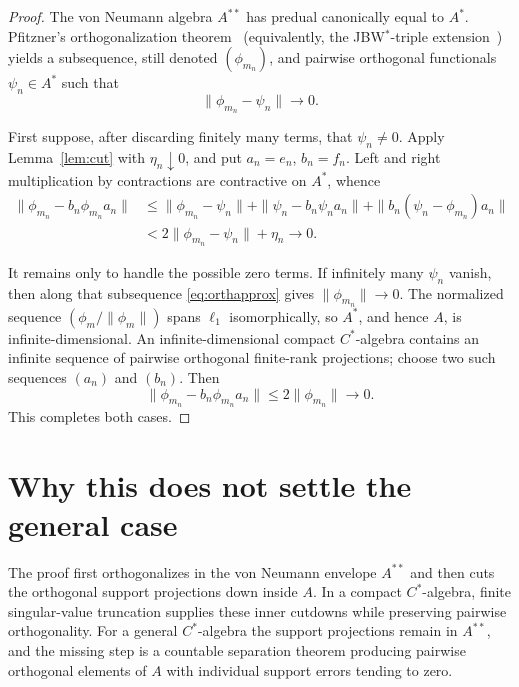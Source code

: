 \documentclass[11pt]{article}
\begin{document}
\begin{proof}
The von Neumann algebra $A^{**}$ has predual canonically equal to $A^*$.
Pfitzner's orthogonalization theorem~\cite[Theorem 1.2]{Pfi02} (equivalently,
the JBW$^*$-triple extension~\cite[Theorem 4.1]{PP16}) yields a subsequence,
still denoted $(\phi_{m_n})$, and pairwise orthogonal functionals
$\psi_n\in A^*$ such that
\begin{equation}\label{eq:orthapprox}
 \|\phi_{m_n}-\psi_n\|\longrightarrow0.
\end{equation}

First suppose, after discarding finitely many terms, that $\psi_n\ne0$.
Apply Lemma~\ref{lem:cut} with $\eta_n\downarrow0$, and put
$a_n=e_n$, $b_n=f_n$.  Left and right multiplication by contractions are
contractive on $A^*$, whence
\begin{align*}
 \|\phi_{m_n}-b_n\phi_{m_n}a_n\|
 &\le \|\phi_{m_n}-\psi_n\|
      +\|\psi_n-b_n\psi_na_n\|
      +\|b_n(\psi_n-\phi_{m_n})a_n\|\\
 &<2\|\phi_{m_n}-\psi_n\|+\eta_n\longrightarrow0.
\end{align*}

It remains only to handle the possible zero terms.  If infinitely many
$\psi_n$ vanish, then along that subsequence \eqref{eq:orthapprox} gives
$\|\phi_{m_n}\|\to0$.  The normalized sequence
$(\phi_m/\|\phi_m\|)$ spans $\ell_1$ isomorphically, so $A^*$, and hence
$A$, is infinite-dimensional.  An infinite-dimensional compact
$C^*$-algebra contains an infinite sequence of pairwise orthogonal
finite-rank projections; choose two such sequences $(a_n)$ and $(b_n)$.
Then
\[
 \|\phi_{m_n}-b_n\phi_{m_n}a_n\|
 \le 2\|\phi_{m_n}\|\longrightarrow0.
\]
This completes both cases.
\end{proof}

\section{Why this does not settle the general case}

The proof first orthogonalizes in the von Neumann envelope $A^{**}$ and then
cuts the orthogonal support projections down inside $A$.  In a compact
$C^*$-algebra, finite singular-value truncation supplies these inner
cutdowns while preserving pairwise orthogonality.  For a general
$C^*$-algebra the support projections remain in $A^{**}$, and the missing
step is a countable separation theorem producing pairwise orthogonal
elements of $A$ with individual support errors tending to zero.
\end{document}
